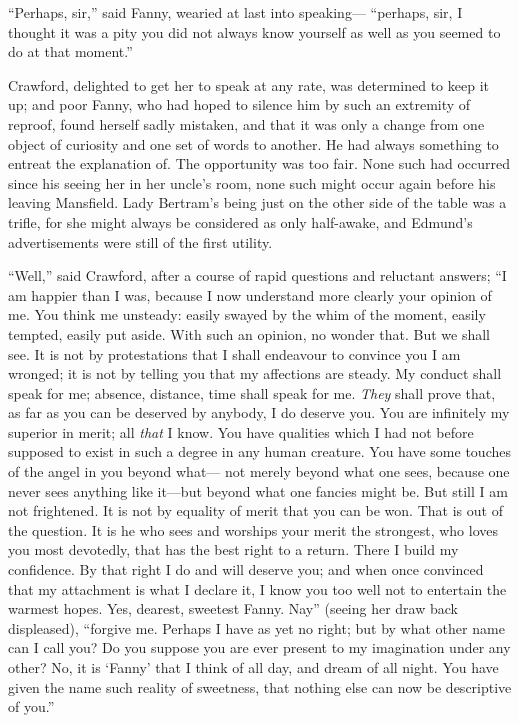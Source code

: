 \documentclass{article}
\begin{document}
``Perhaps, sir,'' said Fanny, wearied at last into speaking---%
``perhaps, sir, I thought it was a pity you did not always
know yourself as well as you seemed to do at that moment.''

Crawford, delighted to get her to speak at any rate,
was determined to keep it up; and poor Fanny, who had
hoped to silence him by such an extremity of reproof,
found herself sadly mistaken, and that it was only a change
from one object of curiosity and one set of words to another.
He had always something to entreat the explanation of.
The opportunity was too fair.  None such had occurred
since his seeing her in her uncle's room, none such might
occur again before his leaving Mansfield.  Lady Bertram's
being just on the other side of the table was a trifle,
for she might always be considered as only half-awake, and
Edmund's advertisements were still of the first utility.

``Well,'' said Crawford, after a course of rapid questions
and reluctant answers; ``I am happier than I was, because I
now understand more clearly your opinion of me.  You think
me unsteady:  easily swayed by the whim of the moment,
easily tempted, easily put aside.  With such an opinion,
no wonder that.  But we shall see.  It is not by protestations
that I shall endeavour to convince you I am wronged;
it is not by telling you that my affections are steady.
My conduct shall speak for me; absence, distance, time shall
speak for me.  \emph{They} shall prove that, as far as you
can be deserved by anybody, I do deserve you.  You are
infinitely my superior in merit; all \emph{that} I know.
You have qualities which I had not before supposed
to exist in such a degree in any human creature.
You have some touches of the angel in you beyond what---%
not merely beyond what one sees, because one never sees
anything like it---but beyond what one fancies might be.
But still I am not frightened.  It is not by equality of
merit that you can be won.  That is out of the question.
It is he who sees and worships your merit the strongest,
who loves you most devotedly, that has the best
right to a return.  There I build my confidence.
By that right I do and will deserve you; and when once
convinced that my attachment is what I declare it,
I know you too well not to entertain the warmest hopes.
Yes, dearest, sweetest Fanny.  Nay'' (seeing her draw back
displeased), ``forgive me.  Perhaps I have as yet no right;
but by what other name can I call you?  Do you suppose
you are ever present to my imagination under any other?
No, it is `Fanny' that I think of all day, and dream
of all night.  You have given the name such reality
of sweetness, that nothing else can now be descriptive
of you.''
\end{document}
